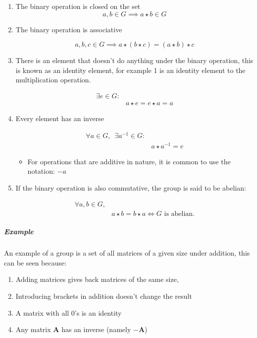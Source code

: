\documentclass[a4paper,11pt,twoside]{article}
\begin{document}
\begin{enumerate}
\item The binary operation is closed on the set
\[a,b \in G \implies a\star b \in G\]
\item The binary operation is associative

\[a,b,c \in G \implies a\star (b\star c) = (a\star b)\star c\]
\item There is an element that doesn't do anything under the binary
operation, this is known as an identity element, for example 1 is
an identity element to the multiplication operation.

\begin{align*}
\exists e \in G:&\\
		& a\star e = e \star a = a
\end{align*}
\item Every element has an inverse

  \begin{align*}
  \forall a \in G,\enspace \exists a^{-1} \in G:	&\\
						   & a\star a^{-1} = e
\end{align*}

\begin{itemize}
\item For operations that are additive in nature, it is common to use
the notation: \(-a\) \cite[\S 3.3]{gregoryleeAbstractAlgebra2018}
\end{itemize}
\item If the binary operation is also commutative, the group is said to be abelian:

\begin{align*}
\forall a,b \in G,& \nonumber \\
		& a \star b = b \star a \iff G \text{ is abelian.} 
\end{align*}
\end{enumerate}

\subparagraph{Example}
\label{sec:orgb09c6ab}

An example of a group is a set of all matrices of a given size under addition,
this can be seen because:

\begin{enumerate}
\item Adding matrices gives back matrices of the same size,
\item Introducing brackets in addition doesn't change the result
\item A matrix with all 0's is an identity
\item Any matrix \(\mathbf{A}\) has an inverse (namely \(-\mathbf{A}\))
\end{enumerate}
\end{document}
